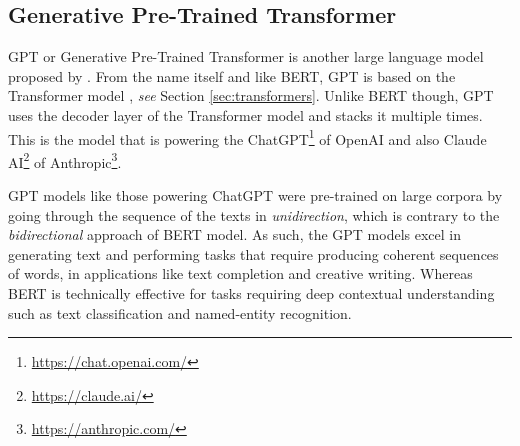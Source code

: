 \subsection{Generative Pre-Trained Transformer}
GPT or Generative Pre-Trained Transformer is another large language model proposed by . From the name itself and like BERT, GPT is based on the Transformer model \cite{vaswani2017attention}, \textit{see} Section \ref{sec:transformers}. Unlike BERT though, GPT uses the decoder layer of the Transformer model and stacks it multiple times. This is the model that is powering the ChatGPT\footnote{\url{https://chat.openai.com/}} of OpenAI and also Claude AI\footnote{\url{https://claude.ai/}} of Anthropic\footnote{\url{https://anthropic.com/}}.

GPT models like those powering ChatGPT were pre-trained on large corpora by going through the sequence of the texts in \textit{unidirection}, which is contrary to the \textit{bidirectional} approach of BERT model. As such, the GPT models excel in generating text and performing tasks that require producing coherent sequences of words, in applications like text completion and creative writing. Whereas BERT is technically effective for tasks requiring deep contextual understanding such as text classification and named-entity recognition.